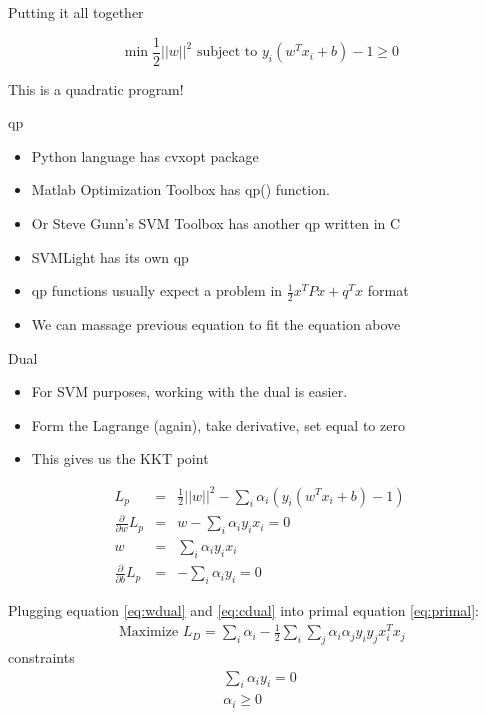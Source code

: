 \documentclass[12pt,fleqn]{article}\usepackage{../common}
\begin{document}
Putting it all together

\begin{equation}
  \min \frac{1}{2}{||w||^2} \textrm{ subject to }  y_{i}(w^Tx_{i}+b)-1 \ge 0 \nonumber
\end{equation}

This is a quadratic program!

qp

\begin{itemize}
   \item Python language has cvxopt package
   \item Matlab Optimization Toolbox has qp() function.
   \item Or Steve Gunn's SVM Toolbox has another qp written in C
   \item SVMLight has its own qp
   \item qp functions usually expect a problem in $\frac{1}{2}x^{T}Px+q^{T}x$
   format
   \item We can massage previous equation to fit the equation above
\end{itemize}


Dual

\begin{itemize}
   \item For SVM purposes, working with the dual  is easier.
   \item Form the Lagrange (again), take derivative, set equal to zero
   \item This gives us the KKT point
\end{itemize}

\begin{eqnarray}
L_{p} &=& \frac{1}{2}||w||^{2}-\sum_{i}\alpha_{i}(y_{i}(w^{T}x_{i}+b)-1)  \label{eq:primal}\\
\frac{\partial}{\partial w} L_{p} &=& w-\sum_{i}\alpha_{i}y_{i}x_{i}=0 \nonumber \\
w &=& \sum_{i}\alpha_{i}y_{i}x_{i} \label{eq:wdual} \\
\frac{\partial}{\partial b} L_{p} &=& -\sum_{i}\alpha_{i}y_{i}=0  \label{eq:cdual}
\end{eqnarray}

Plugging equation \ref{eq:wdual} and \ref{eq:cdual} into primal equation \ref{eq:primal}:
\begin{eqnarray}
\textrm{ Maximize } L_{D}=\sum_{i}\alpha_{i}-\frac{1}{2}\sum_{i}\sum_{j}\alpha_{i}\alpha_{j}y_{i}y_{j}x_{i}^{T}x_{j} \label{eq:svm}
\end{eqnarray}
constraints
\begin{eqnarray*}
\sum_{i}\alpha_{i}y_{i}=0 \nonumber \\
\alpha_{i} \geq 0 \nonumber
\end{eqnarray*}
\end{document}
